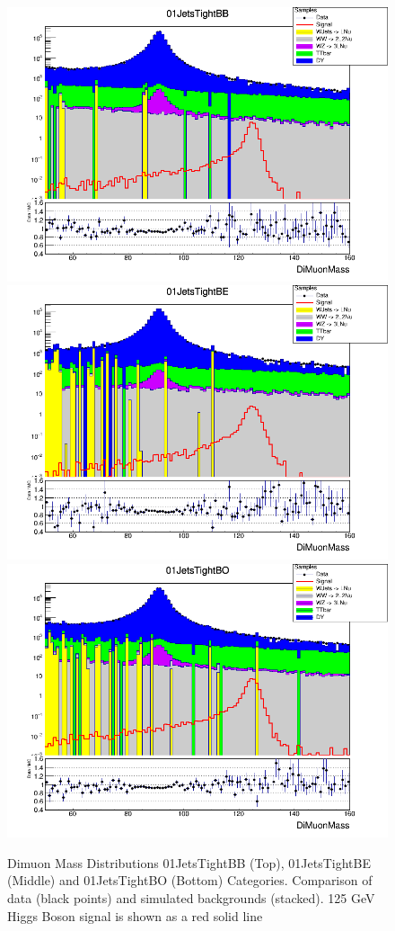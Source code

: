 \begin{figure}[htbp]
  \centering
  \includegraphics[width=0.65\linewidth]{figures/ch_higgs/distributions/baseline_kalman/distribution__01JetsTightBB__DiMuonMass__logY.png}\\
  \includegraphics[width=0.65\linewidth]{figures/ch_higgs/distributions/baseline_kalman/distribution__01JetsTightBE__DiMuonMass__logY.png}\\
  \includegraphics[width=0.65\linewidth]{figures/ch_higgs/distributions/baseline_kalman/distribution__01JetsTightBO__DiMuonMass__logY.png}
  \caption{Dimuon Mass Distributions 01JetsTightBB (Top), 01JetsTightBE (Middle) and 01JetsTightBO (Bottom) Categories. Comparison of data (black points) and simulated backgrounds (stacked). 125 GeV Higgs Boson signal is shown as a red solid line}
  \label{fig:higgs_categorization_01jetstightbbbebo}
\end{figure}

